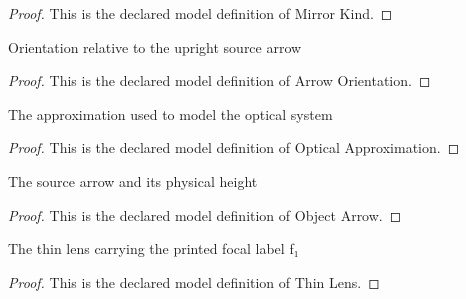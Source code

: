 \begin{proof}
  This is the declared model definition of Mirror Kind.
\end{proof}
\begin{definition}
  \label{def:physics:phyx-mini-0077:phyxminiproblems-problemphyxmini0077-arroworientation}
  Orientation relative to the upright source arrow
\end{definition}
\begin{proof}
  This is the declared model definition of Arrow Orientation.
\end{proof}
\begin{definition}
  \label{def:physics:phyx-mini-0077:phyxminiproblems-problemphyxmini0077-opticalapproximation}
  The approximation used to model the optical system
\end{definition}
\begin{proof}
  This is the declared model definition of Optical Approximation.
\end{proof}
\begin{definition}
  \label{def:physics:phyx-mini-0077:phyxminiproblems-problemphyxmini0077-objectarrow}
  The source arrow and its physical height
\end{definition}
\begin{proof}
  This is the declared model definition of Object Arrow.
\end{proof}
\begin{definition}
  \label{def:physics:phyx-mini-0077:phyxminiproblems-problemphyxmini0077-thinlens}
  The thin lens carrying the printed focal label f₁
\end{definition}
\begin{proof}
  This is the declared model definition of Thin Lens.
\end{proof}
